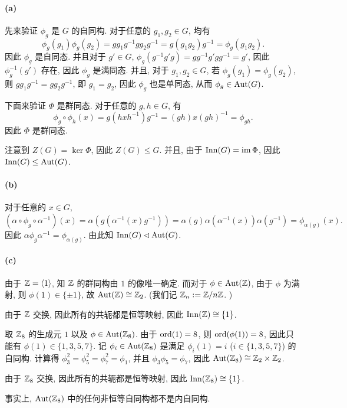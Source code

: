\documentclass{article}
\begin{document}
\begin{solution}
	\paragraph{(a)} 先来验证 $\phi_g$ 是 $G$ 的自同构. 对于任意的 $g_1,g_2\in G$, 均有
	\[ \phi_g(g_1)\phi_g(g_2) = g g_1 g^{-1} g g_2 g^{-1} = g (g_1g_2) g^{-1} = \phi_g(g_1g_2). \]
	因此 $\phi_g$ 是自同态. 并且对于 $g'\in G$, $\phi_g(g^{-1}g'g) = gg^{-1}g'gg^{-1} = g'$, 因此 $\phi_g^{-1}(g')$ 存在, 因此 $\phi_g$ 是满同态. 并且, 对于 $g_1, g_2 \in G$, 若 $\phi_g(g_1) = \phi_g(g_2)$, 则 $gg_1g^{-1} = gg_2g^{-1}$, 即 $g_1 = g_2$, 因此 $\phi_g$ 也是单同态, 从而 $\phi_g\in\operatorname{Aut}(G)$. 

	下面来验证 $\Phi$ 是群同态. 对于任意的 $g,h\in G$, 有
	\[ \phi_g \circ \phi_h(x) = g(hxh^{-1})g^{-1} = (gh) x (gh)^{-1} = \phi_{gh}. \]
	因此 $\Phi$ 是群同态. 
	
	注意到 $Z(G) = \ker \Phi$, 因此 $Z(G) \le G$. 并且, 由于 $\operatorname{Inn}(G) = \operatorname{im} \Phi$, 因此 $\operatorname{Inn}(G) \le \operatorname{Aut}(G)$.

	\paragraph{(b)} 对于任意的 $x\in G$,
	\[ (\alpha \circ \phi_g \circ \alpha^{-1})(x)
	= \alpha(g(\alpha^{-1}(x)g^{-1}))
	=\alpha(g) \alpha(\alpha^{-1}(x)) \alpha(g^{-1})
	=\phi_{\alpha(g)}(x). \]
	因此 $\alpha \phi_g \alpha^{-1} = \phi_{\alpha(g)}$. 由此知 $\operatorname{Inn}(G) \lhd \operatorname{Aut}(G)$.

	\paragraph{(c)} 由于 $\mathbb{Z} = \left\langle 1 \right\rangle$, 知 $\mathbb{Z}$ 的群同构由 $1$ 的像唯一确定. 而对于 $\phi \in \operatorname{Aut}(\mathbb{Z})$, 由于 $\phi$ 为满射, 则 $\phi(1) \in \{\pm 1\}$, 故 $\operatorname{Aut}(\mathbb{Z}) \cong \mathbb{Z}_2$. (我们记 $\mathbb{Z}_n := \mathbb{Z}/n\mathbb{Z}$. )

	由于 $\mathbb{Z}$ 交换, 因此所有的共轭都是恒等映射, 因此 $\operatorname{Inn}(\mathbb{Z}) \cong \{1\}$.

	取 $\mathbb{Z}_8$ 的生成元 $1$ 以及 $\phi\in \operatorname{Aut}(\mathbb{Z}_8)$. 由于 $\operatorname{ord}(1) = 8$, 则 $\operatorname{ord}(\phi(1)) = 8$, 因此只能有 $\phi(1) \in \{1,3,5,7\}$. 记 $\phi_i \in \operatorname{Aut}(\mathbb{Z}_8)$ 是满足 $\phi_i(1) = i$ ($i \in \{1,3,5,7\}$) 的自同构. 计算得 $\phi_3^2 = \phi_5^2 = \phi_7^2 = \phi_1$, 并且 $\phi_3 \phi_5 = \phi_7$, 因此 $\operatorname{Aut}(\mathbb{Z}_8) \cong \mathbb{Z}_2 \times \mathbb{Z}_2$.

	由于 $\mathbb{Z}_8$ 交换, 因此所有的共轭都是恒等映射, 因此 $\operatorname{Inn}(\mathbb{Z}_8) \cong \{1\}$.

	事实上, $\operatorname{Aut}(\mathbb{Z}_8)$ 中的任何非恒等自同构都不是内自同构.


\end{solution}
\end{document}
